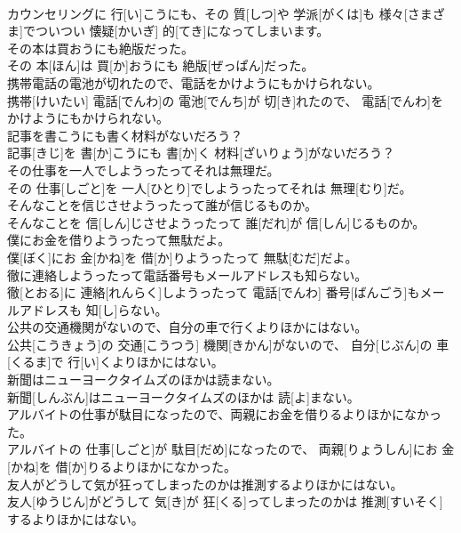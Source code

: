 \documentclass[8pt]{extreport}
\begin{document}
\begin{CJK}{UTF8}{min}
\\	カウンセリングに 行[い]こうにも、その 質[しつ]や 学派[がくは]も 様々[さまざま]でついつい 懐疑[かいぎ] 的[てき]になってしまいます。
\\	その本は買おうにも絶版だった。	
\\	その 本[ほん]は 買[か]おうにも 絶版[ぜっぱん]だった。
\\	携帯電話の電池が切れたので、電話をかけようにもかけられない。	
\\	携帯[けいたい] 電話[でんわ]の 電池[でんち]が 切[き]れたので、 電話[でんわ]をかけようにもかけられない。
\\	記事を書こうにも書く材料がないだろう？	
\\	記事[きじ]を 書[か]こうにも 書[か]く 材料[ざいりょう]がないだろう？
\\	その仕事を一人でしようったってそれは無理だ。	
\\	その 仕事[しごと]を 一人[ひとり]でしようったってそれは 無理[むり]だ。
\\	そんなことを信じさせようったって誰が信じるものか。	
\\	そんなことを 信[しん]じさせようったって 誰[だれ]が 信[しん]じるものか。
\\	僕にお金を借りようったって無駄だよ。	
\\	僕[ぼく]にお 金[かね]を 借[か]りようったって 無駄[むだ]だよ。
\\	徹に連絡しようったって電話番号もメールアドレスも知らない。	
\\	徹[とおる]に 連絡[れんらく]しようったって 電話[でんわ] 番号[ばんごう]もメールアドレスも 知[し]らない。
\\	公共の交通機関がないので、自分の車で行くよりほかにはない。	
\\	公共[こうきょう]の 交通[こうつう] 機関[きかん]がないので、 自分[じぶん]の 車[くるま]で 行[い]くよりほかにはない。
\\	新聞はニューヨークタイムズのほかは読まない。	
\\	新聞[しんぶん]はニューヨークタイムズのほかは 読[よ]まない。
\\	アルバイトの仕事が駄目になったので、両親にお金を借りるよりほかになかった。	
\\	アルバイトの 仕事[しごと]が 駄目[だめ]になったので、 両親[りょうしん]にお 金[かね]を 借[か]りるよりほかになかった。
\\	友人がどうして気が狂ってしまったのかは推測するよりほかにはない。	
\\	友人[ゆうじん]がどうして 気[き]が 狂[くる]ってしまったのかは 推測[すいそく]するよりほかにはない。

\end{CJK}
\end{document}

